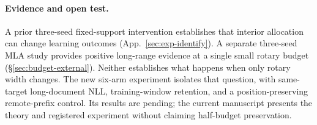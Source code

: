 \paragraph{Evidence and open test.}
A prior three-seed fixed-support intervention establishes that interior
allocation can change learning outcomes (App.~\ref{sec:exp-identify}). A
separate three-seed MLA study provides positive long-range evidence at a single
small rotary budget (\S\ref{sec:budget-external}). Neither establishes what
happens when only rotary width changes. The new six-arm experiment isolates
that question, with same-target long-document NLL, training-window retention,
and a position-preserving remote-prefix control. Its results are pending; the
current manuscript presents the theory and registered experiment without
claiming half-budget preservation.
